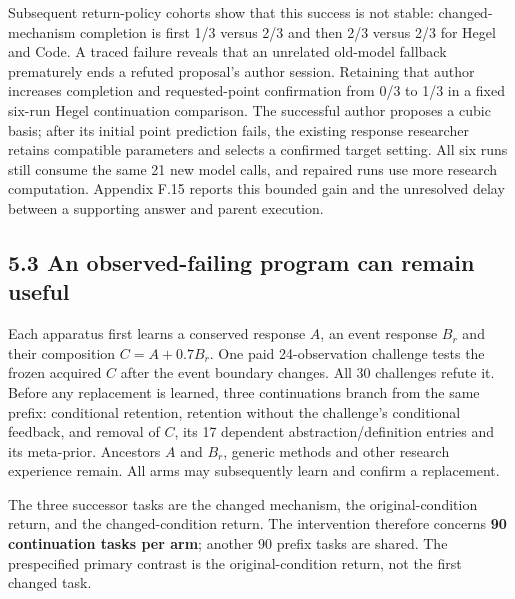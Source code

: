 \documentclass[11pt,a4paper]{article}
\begin{document}
Subsequent return-policy cohorts show that this success is not stable: changed-mechanism completion is first 1/3 versus 2/3 and then 2/3 versus 2/3 for Hegel and Code. A traced failure reveals that an unrelated old-model fallback prematurely ends a refuted proposal's author session. Retaining that author increases completion and requested-point confirmation from 0/3 to 1/3 in a fixed six-run Hegel continuation comparison. The successful author proposes a cubic basis; after its initial point prediction fails, the existing response researcher retains compatible parameters and selects a confirmed target setting. All six runs still consume the same 21 new model calls, and repaired runs use more research computation. Appendix F.15 reports this bounded gain and the unresolved delay between a supporting answer and parent execution.


\subsection*{5.3 An observed-failing program can remain useful}

Each apparatus first learns a conserved response \(A\), an event response \(B_r\) and their composition \(C=A+0.7B_r\). One paid 24-observation challenge tests the frozen acquired \(C\) after the event boundary changes. All 30 challenges refute it. Before any replacement is learned, three continuations branch from the same prefix: conditional retention, retention without the challenge's conditional feedback, and removal of \(C\), its 17 dependent abstraction/definition entries and its meta-prior. Ancestors \(A\) and \(B_r\), generic methods and other research experience remain. All arms may subsequently learn and confirm a replacement.


The three successor tasks are the changed mechanism, the original-condition return, and the changed-condition return. The intervention therefore concerns \textbf{90 continuation tasks per arm}; another 90 prefix tasks are shared. The prespecified primary contrast is the original-condition return, not the first changed task.
\end{document}
